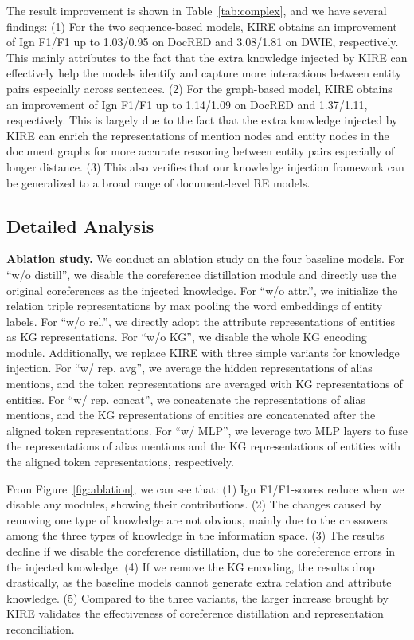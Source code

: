 \documentclass[runningheads]{llncs}
\begin{document}
The result improvement is shown in Table~\ref{tab:complex}, and we have several findings: 
(1) For the two sequence-based models, KIRE obtains an improvement of Ign F1/F1 up to 1.03/0.95 on DocRED and 3.08/1.81 on DWIE, respectively. 
This mainly attributes to the fact that the extra knowledge injected by KIRE can effectively help the models identify and capture more interactions between entity pairs especially across sentences.
(2) For the graph-based model, KIRE obtains an improvement of Ign F1/F1 up to 1.14/1.09 on DocRED and 1.37/1.11, respectively. 
This is largely due to the fact that the extra knowledge injected by KIRE can enrich the representations of mention nodes and entity nodes in the document graphs for more accurate reasoning between entity pairs especially of longer distance.
(3) This also verifies that our knowledge injection framework can be generalized to a broad range of document-level RE models.







\subsection{Detailed Analysis}
\label{subsect:analysis}

\textbf{Ablation study.} We conduct an ablation study on the four baseline models. 
For ``w/o distill'', we disable the coreference distillation module and directly use the original coreferences as the injected knowledge. 
For ``w/o attr.'', we initialize the relation triple representations by max pooling the word embeddings of entity labels.
For ``w/o rel.'', we directly adopt the attribute representations of entities as KG representations. 
For ``w/o KG'', we disable the whole KG encoding module.
Additionally, we replace KIRE with three simple variants for knowledge injection.
For ``w/ rep. avg'', we average the hidden representations of alias mentions, and the token representations are averaged with KG representations of entities.
For ``w/ rep. concat'', we concatenate the representations of alias mentions, and the KG representations of entities are concatenated after the aligned token representations.
For ``w/ MLP'', we leverage two MLP layers to fuse the representations of alias mentions and the KG representations of entities with the aligned token representations, respectively.

From Figure~\ref{fig:ablation}, we can see that: 
(1) Ign F1/F1-scores reduce when we disable any modules, showing their contributions. 
(2) The changes caused by removing one type of knowledge are not obvious, mainly due to the crossovers among the three types of knowledge in the information space. 
(3) The results decline if we disable the coreference distillation, due to the coreference errors in the injected knowledge.
(4) If we remove the KG encoding, the results drop drastically, as the baseline models cannot generate extra relation and attribute knowledge. 
(5) Compared to the three variants, the larger increase brought by KIRE validates the effectiveness of coreference distillation and representation reconciliation.
\end{document}
